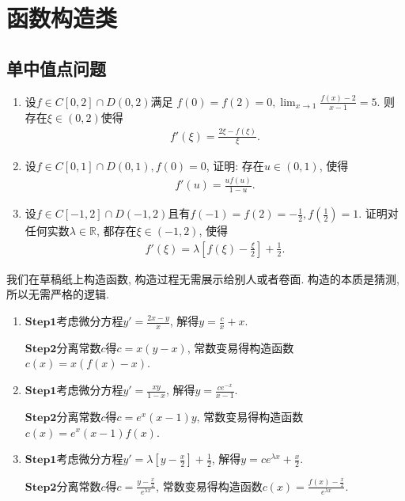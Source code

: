 \documentclass[../../main.tex]{subfiles}
\begin{document}
\section{函数构造类}

\subsection{单中值点问题}

\begin{example}
\begin{enumerate}
\item 设\(f\in C[0,2]\cap D(0,2)\)满足
\(f(0)=f(2)=0,\lim_{x\rightarrow 1}\frac{f(x)-2}{x - 1}=5\).
则存在\(\xi\in(0,2)\)使得
\begin{align*}
f'(\xi)=\frac{2\xi - f(\xi)}{\xi}.
\end{align*}

\item 设\(f\in C[0,1]\cap D(0,1),f(0)=0\), 证明: 存在\(u\in(0,1)\), 使得
\begin{align*}
f'(u)=\frac{uf(u)}{1 - u}.
\end{align*}

\item 设\(f\in C[-1,2]\cap D(-1,2)\)且有\(f(-1)=f(2)=-\frac{1}{2},f(\frac{1}{2}) = 1\). 证明对任何实数\(\lambda\in\mathbb{R}\), 都存在\(\xi\in(-1,2)\), 使得
\begin{align*}
f'(\xi)=\lambda\left[f(\xi)-\frac{\xi}{2}\right]+\frac{1}{2}.
\end{align*}
\end{enumerate}
\end{example}
\begin{note}
我们在草稿纸上构造函数, 构造过程无需展示给别人或者卷面. 构造的本质是猜测, 所以无需严格的逻辑.
\end{note}
\begin{remark}
\begin{enumerate}
\item $\mathbf{Step}\mathbf{1}$考虑微分方程\(y'=\frac{2x - y}{x}\), 解得\(y=\frac{c}{x}+x\).

$\mathbf{Step}\mathbf{2}$分离常数\(c\)得\(c = x(y - x)\), 常数变易得构造函数\(c(x)=x(f(x)-x)\).

\item $\mathbf{Step}\mathbf{1}$考虑微分方程\(y'=\frac{xy}{1 - x}\), 解得\(y=\frac{ce^{-x}}{x - 1}\).

$\mathbf{Step}\mathbf{2}$分离常数\(c\)得\(c = e^{x}(x - 1)y\), 常数变易得构造函数\(c(x)=e^{x}(x - 1)f(x)\).

\item $\mathbf{Step}\mathbf{1}$考虑微分方程\(y'=\lambda\left[y-\frac{x}{2}\right]+\frac{1}{2}\), 解得\(y = ce^{\lambda x}+\frac{x}{2}\).

$\mathbf{Step}\mathbf{2}$分离常数\(c\)得\(c=\frac{y-\frac{x}{2}}{e^{\lambda x}}\), 常数变易得构造函数\(c(x)=\frac{f(x)-\frac{x}{2}}{e^{\lambda x}}\).
\end{enumerate}
\end{remark}
\end{document}
